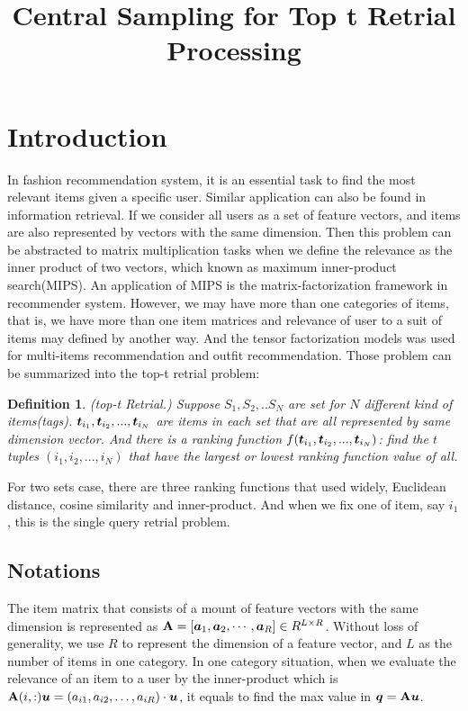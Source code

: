 \documentclass[letterpaper]{article}
\newcommand{\V}[1]{{\bm{{\MakeLowercase{#1}}}}}
\newcommand{\M}[1]{{\bm{\mathbf{\MakeUppercase{#1}}}}}
\newtheorem{definition}{Definition}
\begin{document}
\title{Central Sampling for Top t Retrial Processing}
\date{}
\author{}
\maketitle

\section{Introduction}

In fashion recommendation system, it is an essential task to find the most relevant items given a specific user. Similar application can also be found in information retrieval. If we consider all users as a set of feature vectors, and items are also represented by vectors with the same dimension. Then this problem can be abstracted to matrix multiplication tasks when we define the relevance as the inner product of two vectors, which known as maximum inner-product search(MIPS). An application of MIPS is the  matrix-factorization framework in recommender system\cite{KoYe09}. However, we may have more than one categories of items, that is, we have more than one item matrices and relevance of user to a suit of items may defined by another way. And the tensor factorization models was used for multi-items recommendation\cite{Rendle10} and outfit recommendation\cite{HuYiLa15}. Those problem can be summarized into the top-t retrial problem:

\begin{definition}\label{def:DefinitionTopt}
(top-t Retrial.) Suppose $S_1,S_2,..S_N$ are set for $N$ different kind of items(tags). $\V{t}_{i_1},\V{t}_{i_2},...,\V{t}_{i_N}$ are items in each set that are all represented by same dimension vector. And there is a ranking function $f(\V{t}_{i_1},\V{t}_{i_2},...,\V{t}_{i_N})$: find the $t$ tuples $(i_1,i_2,...,i_N)$ that have the largest or lowest ranking function value of all.
\end{definition}

For two sets case, there are three ranking functions that used widely, Euclidean distance, cosine similarity and inner-product. And when we fix one of item, say ${i_1}$, this is the single query retrial problem.
\subsection{Notations}

The item matrix that consists of a mount of feature vectors with the same dimension is represented as
$\M{A} =[\V{a}_{1},\V{a}_{2},\cdots,\V{a}_{R}]\in R^{L\times R}$. Without loss of generality, we use $R$ to represent the dimension of a feature vector, and $L$ as the number of items in one category. In one category situation, when we evaluate the relevance of an item to a user by the inner-product which is $\M{A}(i,:)\V{u}=(a_{i1},a_{i2},\ldots,a_{iR})\cdot\V{u}$, it equals to find the max value in $\V{q} = \M{a}\V{u}$.
\end{document}

